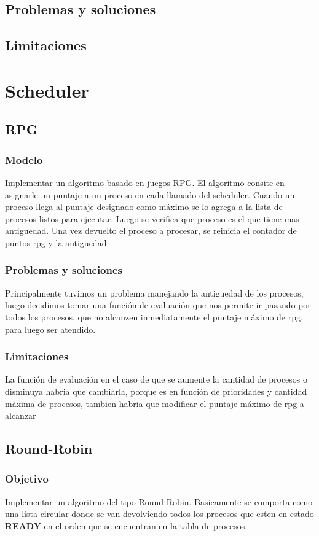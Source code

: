 \documentclass[10pt,a4paper]{article}
\begin{document}
	\subsection{Problemas y soluciones}
	\subsection{Limitaciones}

\section{Scheduler}
	\subsection{RPG}
	\subsubsection{Modelo}
		Implementar un algoritmo basado en juegos RPG. El algoritmo consite en asignarle un puntaje a un proceso en cada llamado del scheduler. Cuando un proceso llega al puntaje designado como m\'aximo se lo agrega a la lista de procesos listos para ejecutar. Luego se verifica que proceso es el que tiene mas antiguedad. Una vez devuelto el proceso a procesar, se reinicia el contador de puntos rpg y la antiguedad.
	\subsubsection{Problemas y soluciones}
		Principalmente tuvimos un problema manejando la antiguedad de los procesos, luego decidimos tomar una funci\'on de evaluaci\'on que nos permite ir pasando por todos los procesos, que no alcanzen inmediatamente el puntaje m\'aximo de rpg, para luego ser atendido.
	\subsubsection{Limitaciones}
		La funci\'on de evaluaci\'on en el caso de que se aumente la cantidad de procesos o disminuya habria que cambiarla, porque es en funci\'on de prioridades y cantidad m\'axima de procesos, tambien habria que modificar el puntaje m\'aximo de rpg a alcanzar

\subsection{Round-Robin}
	\subsubsection{Objetivo}
		Implementar un algoritmo del tipo Round Robin. Basicamente se comporta como una lista circular donde se van devolviendo todos los procesos que esten en estado \textbf{READY} en el orden que se encuentran en la tabla de procesos.
\end{document}
